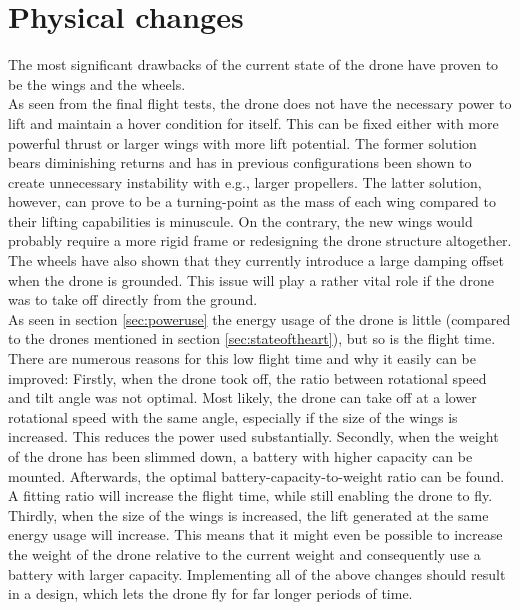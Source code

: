 \section{Physical changes}\label{sec:futureworkphysicalchanges}
The most significant drawbacks of the current state of the drone have proven to be the wings and the wheels.\\
As seen from the final flight tests, the drone does not have the necessary power to lift and maintain a hover condition for itself. This can be fixed either with more powerful thrust or larger wings with more lift potential. The former solution bears diminishing returns and has in previous configurations been shown to create unnecessary instability with e.g., larger propellers. The latter solution, however, can prove to be a turning-point as the mass of each wing compared to their lifting capabilities is minuscule. On the contrary, the new wings would probably require a more rigid frame or redesigning the drone structure altogether.\\
The wheels have also shown that they currently introduce a large damping offset when the drone is grounded. This issue will play a rather vital role if the drone was to take off directly from the ground.\\
As seen in section \ref{sec:poweruse} the energy usage of the drone is little (compared to the drones mentioned in section \ref{sec:stateoftheart}), but so is the flight time. 
There are numerous reasons for this low flight time and why it easily can be improved:
Firstly, when the drone took off, the ratio between rotational speed and tilt angle was not optimal. Most likely, the drone can take off at a lower rotational speed with the same angle, especially if the size of the wings is increased. This reduces the power used substantially. 
Secondly, when the weight of the drone has been slimmed down, a battery with higher capacity can be mounted. Afterwards, the optimal battery-capacity-to-weight ratio can be found. A fitting ratio will increase the flight time, while still enabling the drone to fly. 
Thirdly, when the size of the wings is increased, the lift generated at the same energy usage will increase. This means that it might even be possible to increase the weight of the drone relative to the current weight and consequently use a battery with larger capacity. 
Implementing all of the above changes should result in a design, which lets the drone fly for far longer periods of time. 




